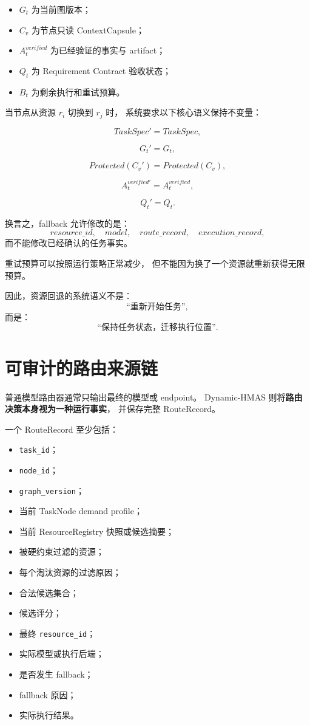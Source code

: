 \documentclass[UTF8,a4paper,12pt,oneside]{ctexbook}
\begin{document}
\begin{itemize}
    \item $G_t$ 为当前图版本；
    \item $C_v$ 为节点只读 ContextCapsule；
    \item $A_t^{verified}$ 为已经验证的事实与 artifact；
    \item $Q_t$ 为 Requirement Contract 验收状态；
    \item $B_t$ 为剩余执行和重试预算。
\end{itemize}

当节点从资源 $r_i$ 切换到 $r_j$ 时，
系统要求以下核心语义保持不变量：

\[
TaskSpec'=TaskSpec,
\]

\[
G_t'=G_t,
\]

\[
Protected(C_v')=Protected(C_v),
\]

\[
A_t^{verified'}=A_t^{verified},
\]

\[
Q_t'=Q_t.
\]

换言之，fallback 允许修改的是：
\[
resource\_id,
\quad
model,
\quad
route\_record,
\quad
execution\_record,
\]
而不能修改已经确认的任务事实。

重试预算可以按照运行策略正常减少，
但不能因为换了一个资源就重新获得无限预算。

因此，资源回退的系统语义不是：
\[
\text{``重新开始任务''},
\]
而是：
\[
\text{``保持任务状态，迁移执行位置''}.
\]


\section{可审计的路由来源链}

普通模型路由器通常只输出最终的模型或 endpoint。
Dynamic-HMAS 则将\textbf{路由决策本身视为一种运行事实}，
并保存完整 RouteRecord。

一个 RouteRecord 至少包括：

\begin{itemize}
    \item \texttt{task\_id}；
    \item \texttt{node\_id}；
    \item \texttt{graph\_version}；
    \item 当前 TaskNode demand profile；
    \item 当前 ResourceRegistry 快照或候选摘要；
    \item 被硬约束过滤的资源；
    \item 每个淘汰资源的过滤原因；
    \item 合法候选集合；
    \item 候选评分；
    \item 最终 \texttt{resource\_id}；
    \item 实际模型或执行后端；
    \item 是否发生 fallback；
    \item fallback 原因；
    \item 实际执行结果。
\end{itemize}
\end{document}
